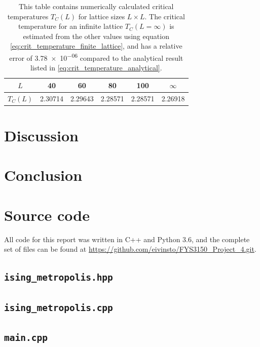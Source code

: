 \documentclass[reprint,english,notitlepage]{revtex4-1}  %
\begin{document}
\begin{table}[H]
\centering
\caption{This table contains numerically calculated critical temperatures $T_C(L)$ for lattice sizes $L \times L$. The critical temperature for an infinite lattice $T_C(L=\infty)$ is estimated from the other values using equation \eqref{eq:crit_temperature_finite_lattice}, and has a relative error of \num{3.78e-06} compared to the analytical result listed in \eqref{eq:crit_temperature_analytical}.} \label{table:crit_temps}
\begin{tabular}{|c|c|c|c|c|c|}
\hline
$L$ & 40 & 60 & 80 & 100 & $\infty$ \\
\hline
$T_C(L)$ & 2.30714 & 2.29643 & 2.28571 & 2.28571 & 2.26918 \\
\hline
\end{tabular}
\end{table}


\newpage

\section{Discussion} \label{sec:V}


\newpage

\section{Conclusion} \label{sec:VI}


\onecolumngrid
{}
\newpage
\twocolumngrid

\appendix
\section{Source code} \label{A}
All code for this report was written in C++ and Python 3.6, and the complete set of files can be found at
\url{https://github.com/eivinsto/FYS3150_Project_4.git}.

\cprotect\subsection{\verb+ising_metropolis.hpp+} \label{A.1}

\cprotect\subsection{\verb+ising_metropolis.cpp+} \label{A.2}

\cprotect\subsection{\verb+main.cpp+} \label{A.3}
\end{document}
